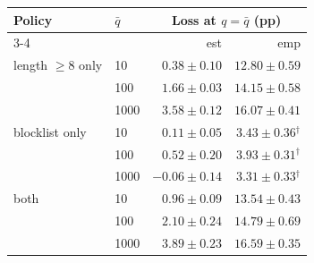 \begin{tabular}{llrr}
\toprule
Policy & $\bar q$ & \multicolumn{2}{c}{Loss at $q=\bar q$ (pp)} \\
\cmidrule(lr){3-4}
 & & est & emp \\
\midrule
length $\geq 8$ only & 10 & $0.38 \pm 0.10$ & $12.80 \pm 0.59$ \\
 & 100 & $1.66 \pm 0.03$ & $14.15 \pm 0.58$ \\
 & 1000 & $3.58 \pm 0.12$ & $16.07 \pm 0.41$ \\
\midrule
blocklist only & 10 & $0.11 \pm 0.05$ & $3.43 \pm 0.36$$^{\dagger}$ \\
 & 100 & $0.52 \pm 0.20$ & $3.93 \pm 0.31$$^{\dagger}$ \\
 & 1000 & $-0.06 \pm 0.14$ & $3.31 \pm 0.33$$^{\dagger}$ \\
\midrule
both & 10 & $0.96 \pm 0.09$ & $13.54 \pm 0.43$ \\
 & 100 & $2.10 \pm 0.24$ & $14.79 \pm 0.69$ \\
 & 1000 & $3.89 \pm 0.23$ & $16.59 \pm 0.35$ \\
\bottomrule
\end{tabular}
